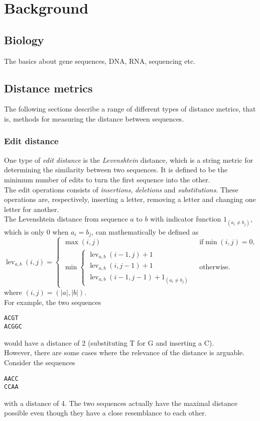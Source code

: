 \section{Background}

\subsection{Biology}
The basics about gene sequences, DNA, RNA, sequencing etc. %

\subsection{Distance metrics}
The following sections describe a range of different types of distance metrics,
that is, methods for measuring the distance between sequences.

\subsubsection{Edit distance}
One type of \emph{edit distance} is the \emph{Levenshtein} distance, which is a
string metric for determining the similarity between two sequences. It is
defined to be the minimum number of edits to turn the first sequence into the
other. \\
The edit operations consists of \emph{insertions}, \emph{deletions} and
\emph{substitutions}. These operations are, respectively, inserting a letter,
removing a letter and changing one letter for another. \\
The Levenshtein distance from sequence $a$ to $b$ with indicator function 
$1_(a_i\neq b_j)$, which is only $0$ when $a_i=b_j$, can mathematically be 
defined as
\begin{equation}
	\operatorname{lev}_{a,b}(i,j)= 
	\begin{cases}
	  	\max(i,j) & \text{ if} \min(i,j)=0, \\
  	  	\min \begin{cases}
        		\operatorname{lev}_{a,b}(i-1,j) + 1 \\
          	\operatorname{lev}_{a,b}(i,j-1) + 1 \\
          	\operatorname{lev}_{a,b}(i-1,j-1) + 1_{(a_i \neq b_j)}
       \end{cases} & \text{ otherwise.}
	\end{cases}
\end{equation}
where $(i,j)=(|a|,|b|)$.\\
For example, the two sequences
\begin{center}
\texttt{ACGT} \\
\texttt{ACGGC}
\end{center}
would have a distance of 2 (substituting T for G and inserting a C). \\
However, there are some cases where the relevance of the distance is arguable.
Consider the sequences
\begin{center}
\texttt{AACC} \\
\texttt{CCAA}
\end{center}
with a distance of 4. The two sequences actually have the maximal distance
possible even though they have a close resemblance to each other.


